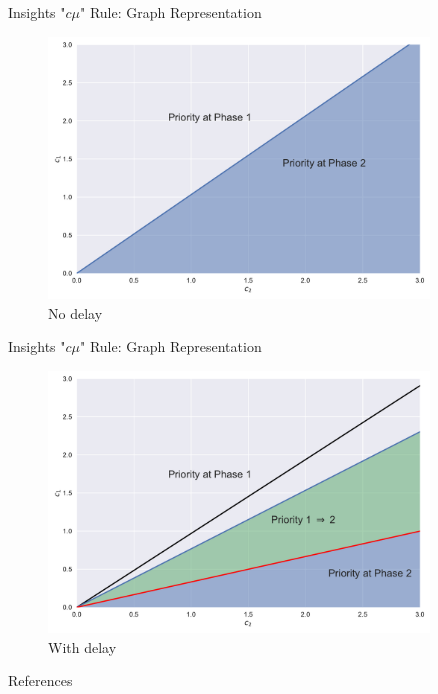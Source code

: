 \documentclass[smaller ,table,usenames,dvipsnames]{beamer}
\newcommand{\?}{\stackrel{?}{=}}
\begin{document}
\begin{frame}{Insights "$c\mu$" Rule: Graph Representation}
    \begin{figure}
        \centering
        \includegraphics[width=0.9\textwidth]{Figures/nodelay}    
        \caption{No delay}
    \end{figure}
\end{frame}

\begin{frame}{Insights "$c\mu$" Rule: Graph Representation}
    \begin{figure}
        \centering
       \includegraphics[width=0.9\textwidth]{Figures/withdelay}
        \caption{With delay}
    \end{figure}
\end{frame}

\begin{frame}{References}

 
\end{frame}
\end{document}
